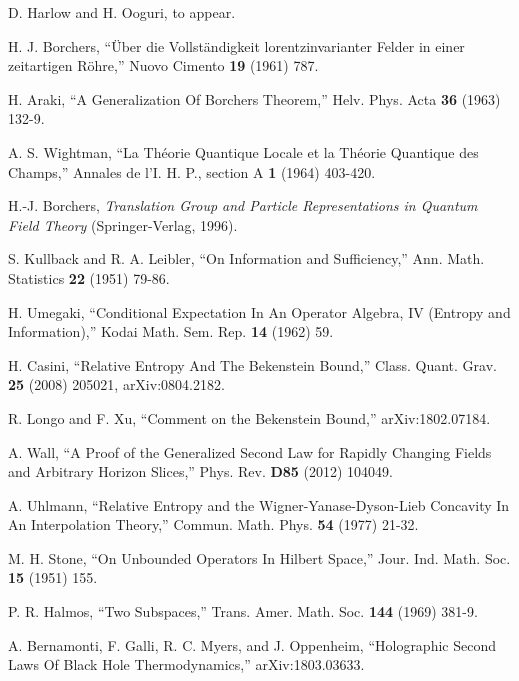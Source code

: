 \documentclass[12pt]{article}
\numberwithin{equation}{section}
\begin{document}
\begin{thebibliography}{99}
 D. Harlow and H. Ooguri, to appear.

H. J. Borchers, ``\"{U}ber die Vollst\"{a}ndigkeit lorentzinvarianter Felder in einer zeitartigen R\"{o}hre,'' Nuovo Cimento {\bf 19} (1961) 787.

H. Araki, ``A Generalization Of Borchers Theorem,'' Helv. Phys. Acta {\bf 36} (1963) 132-9.

A. S. Wightman, ``La Th\'{e}orie Quantique Locale et la Th\'{e}orie Quantique des Champs,'' Annales de l'I. H. P., section A {\bf 1} (1964)
403-420.

H.-J. Borchers,  { \it{Translation Group and Particle Representations in Quantum Field Theory}} (Springer-Verlag, 1996).

S. Kullback and R. A. Leibler, ``On Information and Sufficiency,'' Ann. Math. Statistics {\bf 22} (1951) 79-86.

H. Umegaki, ``Conditional Expectation In An Operator Algebra, IV (Entropy and Information),'' Kodai Math. Sem. Rep. {\bf 14} (1962) 59.

H. Casini, ``Relative Entropy And The Bekenstein Bound,'' Class. Quant. Grav. {\bf 25} (2008) 205021, arXiv:0804.2182.

R. Longo and F. Xu, ``Comment on the Bekenstein Bound,''
arXiv:1802.07184.


A. Wall, ``A Proof of the Generalized Second Law for Rapidly Changing Fields and Arbitrary Horizon Slices,''
Phys. Rev. {\bf D85} (2012) 104049.


A. Uhlmann, ``Relative Entropy and the Wigner-Yanase-Dyson-Lieb Concavity In An Interpolation Theory,'' Commun. Math. Phys.
{\bf 54} (1977) 21-32.


M. H. Stone, ``On Unbounded Operators In Hilbert Space,'' Jour. Ind. Math. Soc. {\bf 15} (1951) 155.

P. R. Halmos, ``Two Subspaces,'' Trans. Amer. Math. Soc. {\bf 144} (1969) 381-9.








A. Bernamonti, F. Galli, R. C. Myers, and J. Oppenheim, ``Holographic Second Laws Of Black Hole Thermodynamics,''
arXiv:1803.03633.



\end{thebibliography}
\end{document}

